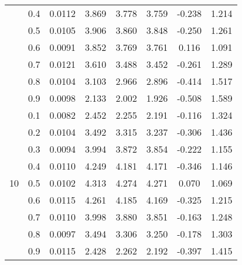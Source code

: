 \documentclass[11pt,a4paper]{report}
\begin{document}
\begin{longtable}{ | c | c || c | c | c | c | c | c | }
 & 0.4 & 0.0112 & 3.869 & 3.778 & 3.759 & -0.238 & 1.214 \\
 & 0.5 & 0.0105 & 3.906 & 3.860 & 3.848 & -0.250 & 1.261 \\
 & 0.6 & 0.0091 & 3.852 & 3.769 & 3.761 & 0.116 & 1.091 \\
 & 0.7 & 0.0121 & 3.610 & 3.488 & 3.452 & -0.261 & 1.289 \\
 & 0.8 & 0.0104 & 3.103 & 2.966 & 2.896 & -0.414 & 1.517 \\
 & 0.9 & 0.0098 & 2.133 & 2.002 & 1.926 & -0.508 & 1.589 \\
 \hline
\multirow{9}{*}{10} & 0.1 & 0.0082 & 2.452 & 2.255 & 2.191 & -0.116 & 1.324 \\
 & 0.2 & 0.0104 & 3.492 & 3.315 & 3.237 & -0.306 & 1.436 \\
 & 0.3 & 0.0094 & 3.994 & 3.872 & 3.854 & -0.222 & 1.155 \\
 & 0.4 & 0.0110 & 4.249 & 4.181 & 4.171 & -0.346 & 1.146 \\
 & 0.5 & 0.0102 & 4.313 & 4.274 & 4.271 & 0.070 & 1.069 \\
 & 0.6 & 0.0115 & 4.261 & 4.185 & 4.169 & -0.325 & 1.215 \\
 & 0.7 & 0.0110 & 3.998 & 3.880 & 3.851 & -0.163 & 1.248 \\
 & 0.8 & 0.0097 & 3.494 & 3.306 & 3.250 & -0.178 & 1.303 \\
 & 0.9 & 0.0115 & 2.428 & 2.262 & 2.192 & -0.397 & 1.415 \\
 \hline
\hline
\end{longtable}
\end{document}
